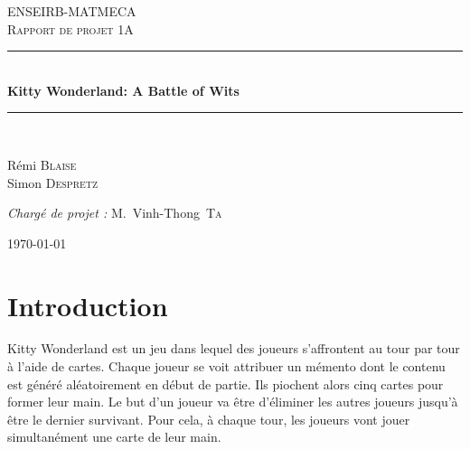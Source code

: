 \documentclass[12pt]{article}
\newcommand{\HRule}{\rule{\linewidth}{0.5mm}}
\begin{document}
\begin{titlepage}
  \begin{sffamily}
  \begin{center}

    \textsc{\LARGE ENSEIRB-MATMECA}\\[2cm]

    \textsc{\Large Rapport de projet 1A}\\[1.5cm]

    \HRule \\[0.4cm]
    { \huge \bfseries Kitty Wonderland: A Battle of Wits\\[0.4cm] }
    \HRule \\[2cm]

    \begin{minipage}{0.4\textwidth}
      \begin{flushleft} \large
        Rémi \textsc{Blaise}\\
        Simon \textsc{Despretz}\\
      \end{flushleft}
    \end{minipage}
    \begin{minipage}{0.4\textwidth}
      \begin{flushright} \large
        \emph{Chargé de projet :} M.~Vinh-Thong~\textsc{Ta}\\
      \end{flushright}
    \end{minipage}

    \vfill

    {\large \today}

  \end{center}
  \end{sffamily}
\end{titlepage}

\newpage

\tableofcontents

\newpage

\section{Introduction}

Kitty Wonderland est un jeu dans lequel des joueurs s'affrontent au tour par tour à l'aide de cartes. Chaque joueur se voit attribuer un mémento dont le contenu est généré aléatoirement en début de partie. Ils piochent alors cinq cartes pour former leur main. Le but d'un joueur va être d'éliminer les autres joueurs jusqu’à être le dernier survivant. Pour cela, à chaque tour, les joueurs vont jouer simultanément une carte de leur main.
\end{document}
